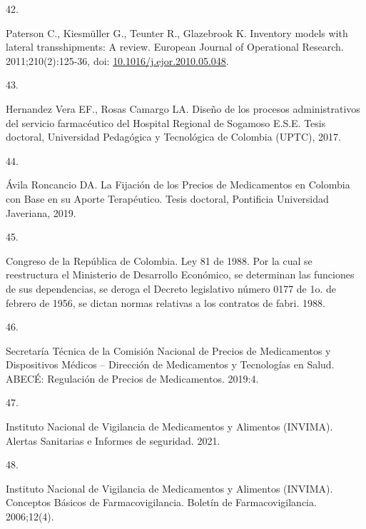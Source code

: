 \documentclass[
]{book}
\newlength{\cslhangindent}
\newlength{\csllabelwidth}
\newlength{\cslentryspacingunit} %
\newenvironment{CSLReferences}[2] %
 {%
  \setlength{\parindent}{0pt}
  \ifodd #1
  \let\oldpar\par
  \def\par{\hangindent=\cslhangindent\oldpar}
  \fi
  \setlength{\parskip}{#2\cslentryspacingunit}
 }%
 {}
\newcommand{\CSLLeftMargin}[1]{\parbox[t]{\csllabelwidth}{#1}}
\newcommand{\CSLRightInline}[1]{\parbox[t]{\linewidth - \csllabelwidth}{#1}\break}
\begin{document}
\begin{CSLReferences}{0}{0}
\leavevmode{}%
\CSLLeftMargin{42. }
\CSLRightInline{Paterson C., Kiesmüller G., Teunter R., Glazebrook K. {Inventory models with lateral transshipments: A review}. European Journal of Operational Research. 2011;210(2):125-36, doi: \href{https://doi.org/10.1016/j.ejor.2010.05.048}{10.1016/j.ejor.2010.05.048}.}

\leavevmode{}%
\CSLLeftMargin{43. }
\CSLRightInline{Hernandez Vera EF., Rosas Camargo LA. {Dise{ñ}o de los procesos administrativos del servicio farmac{é}utico del Hospital Regional de Sogamoso E.S.E.} Tesis doctoral, Universidad Pedag{ó}gica y Tecnol{ó}gica de Colombia (UPTC), 2017.}

\leavevmode{}%
\CSLLeftMargin{44. }
\CSLRightInline{Ávila Roncancio DA. {La Fijaci{ó}n de los Precios de Medicamentos en Colombia con Base en su Aporte Terap{é}utico}. Tesis doctoral, Pontificia Universidad Javeriana, 2019.}

\leavevmode{}%
\CSLLeftMargin{45. }
\CSLRightInline{Congreso de la República de Colombia. {Ley 81 de 1988. Por la cual se reestructura el Ministerio de Desarrollo Econ{ó}mico, se determinan las funciones de sus dependencias, se deroga el Decreto legislativo n{ú}mero 0177 de 1o. de febrero de 1956, se dictan normas relativas a los contratos de fabri}. 1988.}

\leavevmode{}%
\CSLLeftMargin{46. }
\CSLRightInline{Secretaría Técnica de la Comisión Nacional de Precios de Medicamentos y Dispositivos Médicos -- Dirección de Medicamentos y Tecnologías en Salud. {ABEC{É}: Regulaci{ó}n de Precios de Medicamentos}. 2019:4.}

\leavevmode{}%
\CSLLeftMargin{47. }
\CSLRightInline{Instituto Nacional de Vigilancia de Medicamentos y Alimentos (INVIMA). {Alertas Sanitarias e Informes de seguridad}. 2021.}

\leavevmode{}%
\CSLLeftMargin{48. }
\CSLRightInline{Instituto Nacional de Vigilancia de Medicamentos y Alimentos (INVIMA). {Conceptos B{á}sicos de Farmacovigilancia}. Bolet{í}n de Farmacovigilancia. 2006;12(4).}

\end{CSLReferences}
\end{document}
